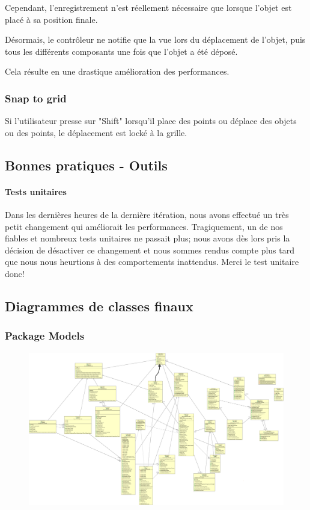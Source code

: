 	Cependant, l'enregistrement n'est réellement nécessaire que lorsque l'objet
	est placé à sa position finale.

	Désormais, le contrôleur ne notifie que la vue lors du déplacement de l'objet,
	puis tous les différents composants une fois que l'objet a été déposé.

	Cela résulte en une drastique amélioration des performances.

	\subsubsection{Snap to grid}
	Si l'utilisateur presse sur "Shift" lorsqu'il place des points ou déplace
	des objets ou des points, le déplacement est locké à la grille.

\subsection{Bonnes pratiques - Outils}

	\paragraph{Tests unitaires}
	Dans les dernières heures de la dernière itération, nous avons effectué un 
	très petit changement qui améliorait les performances. Tragiquement, un de nos
	fiables et nombreux tests unitaires ne passait plus; nous avons dès lors 
	pris la décision de désactiver ce changement et nous sommes rendus compte plus
	tard que nous nous heurtions à des comportements inattendus. Merci le test 
	unitaire donc!

\subsection{Diagrammes de classes finaux}

	\subsubsection{Package Models}
	\begin{figure}[H]
		\center
		\includegraphics[width=\textwidth]{iteration4/fig/models-final-hand.png}
	\end{figure}


